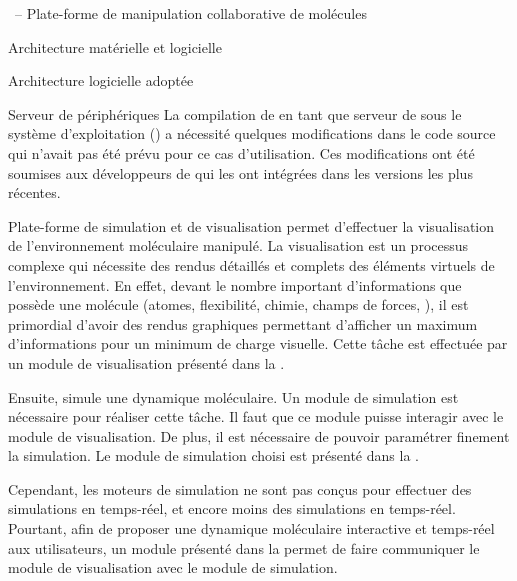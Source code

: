 \documentclass[myfrancais,ngerman,english,frenchb]{mythesis}
\begin{document}
\begin{mychapter}{\myShaddock\ -- Plate-forme de manipulation collaborative de molécules}
\begin{mysection}{Architecture matérielle et logicielle}
\begin{mysubsection}{Architecture logicielle adoptée}
\begin{mysubsubsection}{Serveur de périphériques}
					La compilation de  en tant que serveur de \myOmni sous le système d'exploitation \myLinux (\myUbuntu) a nécessité quelques modifications dans le code source qui n'avait pas été prévu pour ce cas d'utilisation.
					Ces modifications ont été soumises aux développeurs de  qui les ont intégrées dans les versions les plus récentes.
				\end{mysubsubsection}
			\end{mysubsection}
		\end{mysection}
		\begin{mysection}{Plate-forme de simulation et de visualisation}
			\myShaddock permet d'effectuer la visualisation de l'environnement moléculaire manipulé.
			La visualisation est un processus complexe qui nécessite des rendus détaillés et complets des éléments virtuels de l'environnement.
			En effet, devant le nombre important d'informations que possède une molécule (atomes, flexibilité, chimie, champs de forces, \myetc), il est primordial d'avoir des rendus graphiques permettant d'afficher un maximum d'informations pour un minimum de charge visuelle.
			Cette tâche est effectuée par un module de visualisation présenté dans la .

			Ensuite, \myShaddock simule une dynamique moléculaire.
			Un module de simulation est nécessaire pour réaliser cette tâche.
			Il faut que ce module puisse interagir avec le module de visualisation.
			De plus, il est nécessaire de pouvoir paramétrer finement la simulation.
			Le module de simulation choisi est présenté dans la .

			Cependant, les moteurs de simulation ne sont pas conçus pour effectuer des simulations en temps-réel, et encore moins des simulations  en temps-réel.
			Pourtant, afin de proposer une dynamique moléculaire interactive et temps-réel aux utilisateurs, un module présenté dans la  permet de faire communiquer le module de visualisation avec le module de simulation.


\end{mysection}
\end{mychapter}
\end{document}

